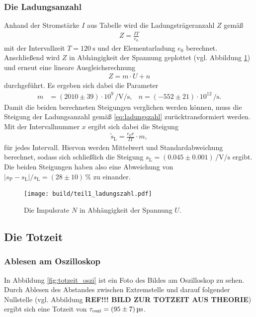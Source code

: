\subsubsection[]{Die Ladungsanzahl}
Anhand der Stromstärke $I$ aus Tabelle  wird die Ladungsträgeranzahl $Z$ gemäß
\begin{align}
    Z = \frac{I T}{e_0}
\end{align}
mit der Intervallzeit $T = \qty[]{120}{\second}$ und der Elementarladung $e_0$ berechnet.
Anschließend wird $Z$ in Abhängigkeit der Spannung geplottet (vgl. Abbildung \ref{fig:ladungszahl}) und erneut eine lineare Ausgleichsrechnung
\begin{align}
    Z = m \cdot U + n
    \label{eq:ladungszahl}
\end{align}
durchgeführt.
Es ergeben sich dabei die Parameter
\begin{align}
    m &= (2010 \pm 39) \cdot 10^9 \, \unit{\per\volt\per\second},  & n = (-552 \pm 21) \cdot 10^{12} \, \unit{\per\second}.
\end{align}
Damit die beiden berechneten Steigungen verglichen werden können, muss die Steigung der Ladungsanzahl gemäß \eqref{eq:ladungszahl}
zurücktransformiert werden.
Mit der Intervallnummer $x$ ergibt sich dabei die Steigung
\begin{align}
    \tilde{s}_\text{L} = \frac{e_0 x}{I T} \cdot m,
\end{align}
für jedes Intervall.
Hiervon werden Mittelwert und Standardabweichung berechnet, sodass sich schließlich die Steigung 
$s_\text{L} = (0.045 \pm 0.001) \, \unit{\per\volt\per\second}$ ergibt.
Die beiden Steigungen haben also eine Abweichung von $|s_\text{P} - s_\text{L}|/s_\text{L} = (28 \pm 10) \, \%$ zu einander.

\begin{figure}[H]
    \centering
    \texttt{[image: build/teil1\_ladungszahl.pdf]}
    \caption{Die Impulsrate $N$ in Abhängigkeit der Spannung $U$.}
    \label{fig:ladungszahl}
\end{figure}






\subsection[]{Die Totzeit}

\subsubsection[]{Ablesen am Oszilloskop}
In Abbildung \ref{fig:totzeit_oszi} ist ein Foto des Bildes am Oszilloskop zu sehen.
Durch Ablesen des Abstandes zwischen Extremstelle und darauf folgender Nullstelle (vgl. Abbildung \textbf{REF!!! BILD ZUR TOTZEIT AUS THEORIE}) ergibt 
sich eine Totzeit von $\tau_\text{oszi} = \qty[]{95 +- 7}{\micro\second}$.

